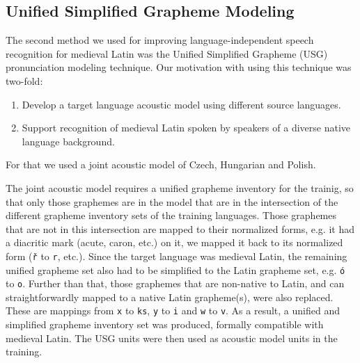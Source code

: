 \documentclass[runningheads,a4paper]{llncs}
\begin{document}
\subsection{Unified Simplified Grapheme Modeling}\label{usg}
The second method we used for improving language-independent speech recognition for medieval Latin was the Unified Simplified Grapheme (USG) pronunciation modeling technique.
Our motivation with using this technique was two-fold:
\begin{enumerate}
\item Develop a target language acoustic model using different source languages.
\item Support recognition of medieval Latin spoken by speakers of a diverse native language background.
\end{enumerate}
For that we used a joint acoustic model of Czech, Hungarian and Polish.

The joint acoustic model requires a unified grapheme inventory for the trainig, so that only those graphemes are in the model that are in the intersection of the different grapheme inventory sets of the training languages.
Those graphemes that are not in this intersection are mapped to their normalized forms, e.g. it had a diacritic mark (acute, caron, etc.) on it, we mapped it back to its normalized form (\texttt{\v{r}} to \texttt{r}, etc.).
Since the target language was medieval Latin, the remaining unified grapheme set also had to be simplified to the Latin grapheme set, e.g. \texttt{\'{o}} to \texttt{o}.
Further than that, those graphemes that are non-native to Latin, and can straightforwardly mapped to a native Latin grapheme(s), were also replaced.
These are mappings from \texttt{x} to \texttt{ks}, \texttt{y} to \texttt{i} and \texttt{w} to \texttt{v}.
As a result, a unified and simplified grapheme inventory set was produced, formally compatible with medieval Latin.
The USG units were then used as acoustic model units in the training.
\end{document}
